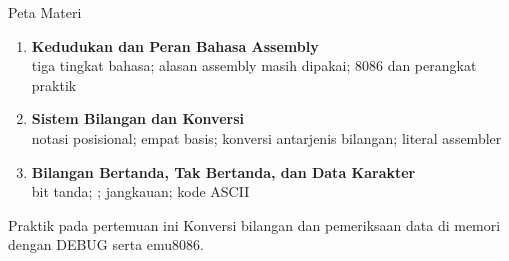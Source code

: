 \documentclass[aspectratio=169,11pt]{beamer}
\begin{document}
\begin{frame}{Peta Materi}
\small
\begin{enumerate}
    \item \textbf{Kedudukan dan Peran Bahasa Assembly}\\
          {\footnotesize tiga tingkat bahasa; alasan assembly masih
          dipakai; 8086 dan perangkat praktik}

    \vspace{0.25em}
    \item \textbf{Sistem Bilangan dan Konversi}\\
          {\footnotesize notasi posisional; empat basis; konversi
          antarjenis bilangan; literal assembler}

    \vspace{0.25em}
    \item \textbf{Bilangan Bertanda, Tak Bertanda, dan Data Karakter}\\
          {\footnotesize bit tanda; ;
          jangkauan; kode ASCII}
\end{enumerate}

\vspace{0.35em}
\begin{block}{Praktik pada pertemuan ini}
\small Konversi bilangan dan pemeriksaan data di memori dengan
DEBUG serta emu8086.
\end{block}
\end{frame}

\end{document}
